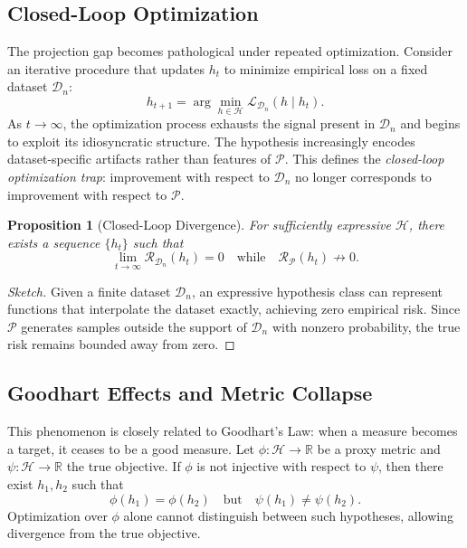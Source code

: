 \documentclass[12pt]{article}
\theoremstyle{plain}
\newtheorem{proposition}[theorem]{Proposition}
\theoremstyle{definition}
\theoremstyle{remark}
\begin{document}
\subsection{Closed-Loop Optimization}

The projection gap becomes pathological under repeated optimization. Consider an iterative procedure that updates $h_t$ to minimize empirical loss on a fixed dataset $\mathcal{D}_n$:
\[
h_{t+1} = \arg\min_{h \in \mathcal{H}} \mathcal{L}_{\mathcal{D}_n}(h \mid h_t).
\]
As $t \to \infty$, the optimization process exhausts the signal present in $\mathcal{D}_n$ and begins to exploit its idiosyncratic structure. The hypothesis increasingly encodes dataset-specific artifacts rather than features of $\mathcal{P}$. This defines the \emph{closed-loop optimization trap}: improvement with respect to $\mathcal{D}_n$ no longer corresponds to improvement with respect to $\mathcal{P}$.

\begin{proposition}[Closed-Loop Divergence]
For sufficiently expressive $\mathcal{H}$, there exists a sequence $\{h_t\}$ such that
\[
\lim_{t \to \infty} \mathcal{R}_{\mathcal{D}_n}(h_t) = 0 \quad \text{while} \quad \mathcal{R}_{\mathcal{P}}(h_t) \not\to 0.
\]
\end{proposition}

\begin{proof}[Sketch]
Given a finite dataset $\mathcal{D}_n$, an expressive hypothesis class can represent functions that interpolate the dataset exactly, achieving zero empirical risk. Since $\mathcal{P}$ generates samples outside the support of $\mathcal{D}_n$ with nonzero probability, the true risk remains bounded away from zero.
\end{proof}

\subsection{Goodhart Effects and Metric Collapse}

This phenomenon is closely related to Goodhart's Law: when a measure becomes a target, it ceases to be a good measure. Let $\phi: \mathcal{H} \to \mathbb{R}$ be a proxy metric and $\psi: \mathcal{H} \to \mathbb{R}$ the true objective. If $\phi$ is not injective with respect to $\psi$, then there exist $h_1, h_2$ such that
\[
\phi(h_1) = \phi(h_2) \quad \text{but} \quad \psi(h_1) \neq \psi(h_2).
\]
Optimization over $\phi$ alone cannot distinguish between such hypotheses, allowing divergence from the true objective.
\end{document}
